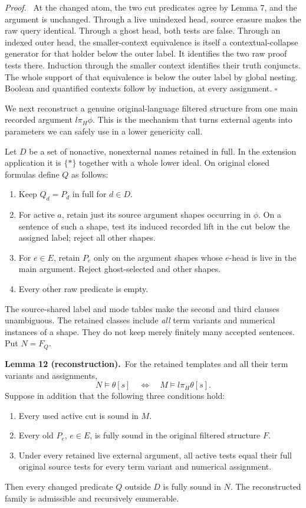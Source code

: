 \documentclass[11pt]{article}
\newcommand{\qed}{\hfill\ensuremath{\square}}
\newenvironment{proof}{\par\emph{Proof.}\ }{\qed\par}
\newcommand{\statement}[2]{\par\textbf{#1.}\ #2\par}
\begin{document}
\begin{proof}
At the changed atom, the two cut predicates agree by Lemma 7, and the
argument is unchanged. Through a live unindexed head, source erasure
makes the raw query identical. Through a ghost head, both tests are
false. Through an indexed outer head, the smaller-context equivalence
is itself a contextual-collapse generator for that holder below the
outer label. It identifies the two raw proof tests there. Induction
through the smaller context identifies their truth conjuncts. The whole
support of that equivalence is below the outer label by global nesting.
Boolean and quantified contexts follow by induction, at every assignment.
\end{proof}

We next reconstruct a genuine original-language filtered structure
from one main recorded argument $l\pi_H\phi$. This is the mechanism
that turns external agents into parameters we can safely use in a
lower genericity call.

Let $D$ be a set of nonactive, nonexternal names retained in full. In
the extension application it is $\{*\}$ together with a whole lower
ideal. On original closed formulas define $Q$ as follows:
\begin{enumerate}
\item Keep $Q_d=P_d$ in full for $d\in D$.
\item For active $a$, retain just its source argument shapes occurring
in $\phi$. On a sentence of such a shape, test its induced recorded
lift in the cut below the assigned label; reject all other shapes.
\item For $e\in E$, retain $P_e$ only on the argument shapes whose
$e$-head is live in the main argument. Reject ghost-selected and other
shapes.
\item Every other raw predicate is empty.
\end{enumerate}
The source-shared label and mode tables make the second and third
clauses unambiguous. The retained classes include \emph{all} term
variants and numerical instances of a shape. They do not keep merely
finitely many accepted sentences. Put $N=F_Q$.

\statement{Lemma 12 (reconstruction)}{For the retained templates and
all their term variants and assignments,
\begin{equation}\label{eq:reconstruction}
 N\models\theta[s]\quad\Longleftrightarrow\quad
 M\models l\pi_H\theta[s].
\end{equation}
Suppose in addition that the following three conditions hold:
\begin{enumerate}
\item[(S)] Every used active cut is sound in $M$.
\item[(E)] Every old $P_e$, $e\in E$, is fully sound in the original
filtered structure $F$.
\item[(X)] Under every retained live external argument, all active
tests equal their full original source tests for every term variant
and numerical assignment.
\end{enumerate}
Then every changed predicate $Q$ outside $D$ is fully sound in $N$.
The reconstructed family is admissible and recursively enumerable.}
\end{document}
